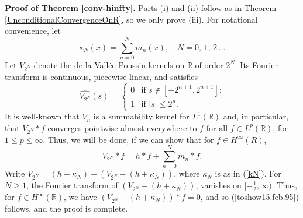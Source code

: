 \documentclass[12pt]{article}
\newcommand{\R}{\mathbb R}
\begin{document}
{\bf Proof of Theorem \ref{conv-hinfty}.}  
Parts (i) and (ii) follow
as in Theorem \ref{UnconditionalConvergenceOnR},
so we only prove (iii).  
For notational convenience, let
\begin{equation}
\kappa_N(x)=\sum_{n=0}^N m_n(x),\quad N=0,\,1,\, 2\, \ldots
\label{kN}
\end{equation}
Let $V_{2^N}$ denote the de la Vall\'ee
Poussin kernels on $\R$ of order $2^N$.
Its Fourier transform is 
continuous, piecewise linear, 
and satisfies 
\begin{equation}
\widehat{V_{2^N}}(s)=\left\{
\begin{array}{ll}
0 & \mbox{if $s\not\in [-2^{n+1},2^{n+1}]$;}\\
1 &  \mbox{if $|s|\leq 2^n$.}      
\end{array}
\right.
\label{Vn-hat}
\end{equation}
It is well-known that $V_{n}$ is a summability kernel for 
$L^1(\R)$ and, in particular, that $V_{2^N}*f$
converges pointwise almost everywhere to $f$
for all $f\in L^p(\R)$, for $1\leq p\leq \infty$.
Thus, we will be done, if we can show that for $f\in
H^\infty(R)$,
\begin{equation}
V_{2^N}*f=h*f+ \sum^N_{n=0}  m_n*f.
\label{toshow15.feb.95}
\end{equation}
Write $V_{2^N}=(h+\kappa_{N})+(V_{2^N}-(h+\kappa_{N}))$,
where $\kappa_N$ is as in (\ref{kN}).
For $N\geq 1$, the Fourier transform of $(V_{2^N}-(h+\kappa_{N}))$,
vanishes on $[-\frac{1}{2},\infty)$.
Thus, for $f\in H^\infty(\R)$, we have
$(V_{2^N}-(h+\kappa_{N}))*f=0$, and so
(\ref{toshow15.feb.95}) follows, and the proof
is complete.










\end{document}
